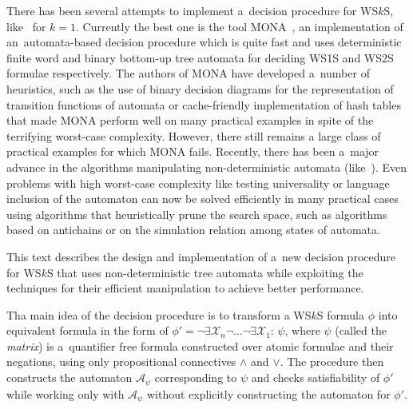 There has been several attempts to implement a~decision procedure for WS$k$S,
like~\cite{nfa} for $k = 1$. Currently the best one is the tool
\textsc{MONA}~\cite{mona-tacas}, an implementation of an~automata-based decision
procedure which is quite fast and uses deterministic finite word and binary
bottom-up tree automata for deciding WS1S and WS2S formulae respectively. The
authors of \textsc{MONA} have developed a~number of heuristics, such as the use
of binary decision diagrams for the representation of transition functions of
automata or cache-friendly implementation of hash tables that made \textsc{MONA}
perform well on many practical examples in spite of the terrifying worst-case
complexity. However, there still remains a large class of practical examples for
which \textsc{MONA} fails.
\newpage
Recently, there has been a~major advance in the algorithms manipulating
non-deter\-mi\-ni\-stic automata (like~\cite{vata}). Even problems with high
worst-case complexity like testing universality or language inclusion of
the automaton can now be solved efficiently in many practical cases using
algorithms that heuristically prune the search space, such as algorithms based
on antichains or on the simulation relation among states of automata.

This text describes the design and implementation of a~new decision
procedure for WS$k$S that uses non-deterministic tree automata while exploiting
the techniques for their efficient manipulation to achieve better performance.

Tha main idea of the decision procedure is to transform a WS$k$S formula $\phi$
into equivalent formula in the form of $\phi' =
\neg\exists\mathcal{X}_n\neg\ldots\neg\exists\mathcal{X}_1:\,\psi$, where $\psi$
(called the \emph{matrix}) is a~quantifier free formula constructed over atomic
formulae and their negations, using only propositional connectives $\wedge$ and
$\vee$. The procedure then constructs the automaton $\mathcal{A}_\psi$ corresponding to
$\psi$ and checks satisfiability of $\phi'$ while working only with
$\mathcal{A}_\psi$ without explicitly constructing the automaton for $\phi'$.

